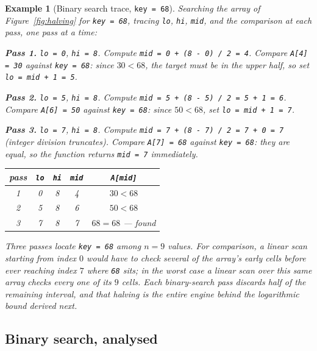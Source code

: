 \documentclass[11pt]{article}
\newtheorem{example}{Example}[section]
\begin{document}
\begin{example}[Binary search trace, \texttt{key = 68}]
Searching the array of Figure~\ref{fig:halving} for \texttt{key = 68},
tracing \texttt{lo}, \texttt{hi}, \texttt{mid}, and the comparison at each
pass, one pass at a time:

\textbf{Pass 1.} \texttt{lo = 0}, \texttt{hi = 8}. Compute
\texttt{mid = 0 + (8 - 0) / 2 = 4}. Compare \texttt{A[4] = 30} against
\texttt{key = 68}: since $30 < 68$, the target must be in the upper half, so
set \texttt{lo = mid + 1 = 5}.

\textbf{Pass 2.} \texttt{lo = 5}, \texttt{hi = 8}. Compute
\texttt{mid = 5 + (8 - 5) / 2 = 5 + 1 = 6}. Compare \texttt{A[6] = 50}
against \texttt{key = 68}: since $50 < 68$, set \texttt{lo = mid + 1 = 7}.

\textbf{Pass 3.} \texttt{lo = 7}, \texttt{hi = 8}. Compute
\texttt{mid = 7 + (8 - 7) / 2 = 7 + 0 = 7} (integer division truncates).
Compare \texttt{A[7] = 68} against \texttt{key = 68}: they are equal, so the
function returns \texttt{mid = 7} immediately.

\begin{center}
\begin{tabular}{ccccc}
\toprule
\textbf{pass} & \texttt{lo} & \texttt{hi} & \texttt{mid} & \texttt{A[mid]} \\
\midrule
1 & 0 & 8 & 4 & $30 < 68$ \\
2 & 5 & 8 & 6 & $50 < 68$ \\
3 & 7 & 8 & 7 & $68 = 68$ --- found \\
\bottomrule
\end{tabular}
\end{center}

Three passes locate \texttt{key = 68} among $n = 9$ values. For comparison,
a linear scan starting from index $0$ would have to check several of the
array's early cells before ever reaching index $7$ where \texttt{68} sits;
in the worst case a linear scan over this same array checks every one of
its $9$ cells. Each binary-search pass discards half of the remaining
interval, and that halving is the entire engine behind the logarithmic
bound derived next.
\end{example}

\subsection{Binary search, analysed}
\end{document}
